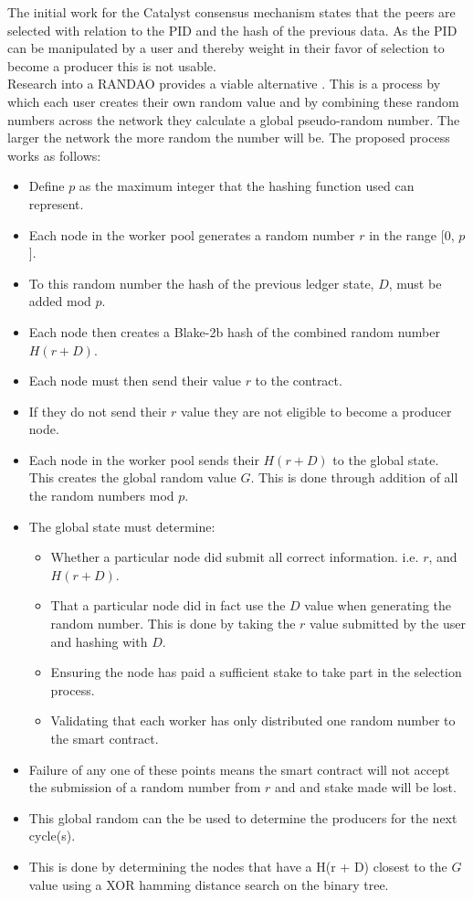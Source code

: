 The initial work for the Catalyst consensus mechanism states that the peers are selected with relation to the PID and the hash of the previous data. As the PID can be manipulated by a user and thereby weight in their favor of selection to become a producer this is not usable. \\

Research into a RANDAO provides a viable alternative \cite{skvorc}\cite{randao}. This is a process by which each user creates their own random value and by combining these random numbers across the network they calculate a global pseudo-random number. The larger the network the more random the number will be. The proposed process works as follows: \\

\begin{itemize}

\item Define $p$ as the maximum integer that the hashing function used can represent.
\item Each node in the worker pool generates a random number $r$ in the range [0, $p$].
\item To this random number the hash of the previous ledger state, $D$, must be added mod $p$.
\item Each node then creates a Blake-2b hash of the combined random number $H(r + D)$.
\item Each node must then send their value $r$ to the contract.
\item If they do not send their $r$ value they are not eligible to become a producer node.
\item Each node in the worker pool sends their $H(r + D)$ to the global state. This creates the global random value $G$. This is done through addition of all the random numbers mod $p$.
\item The global state must determine:
\begin{itemize}
\item Whether a particular node did submit all correct information. i.e. $r$, and $H(r+D)$.
\item That a particular node did in fact use the $D$ value when generating the random number. This is done by taking the $r$ value submitted by the user and hashing with $D$.
\item Ensuring the node has paid a sufficient stake to take part in the selection process.
\item Validating that each worker has only distributed one random number to the smart contract.
\end{itemize}
\item Failure of any one of these points means the smart contract will not accept the submission of a random number from $r$ and and stake made will be lost.
\item This global random can the be used to determine the producers for the next cycle(s).
\item This is done by determining the nodes that have a H(r + D) closest to the $G$ value using a XOR hamming distance search on the binary tree.\\

\end{itemize}

